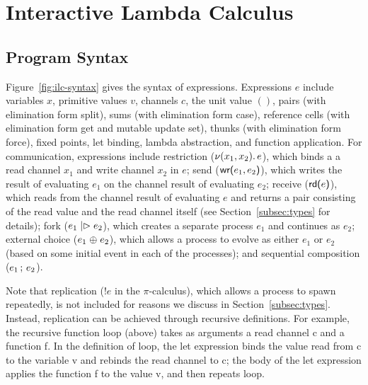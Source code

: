 \section{Interactive Lambda Calculus}
\label{sec:ilc}

\subsection{Program Syntax}
\label{subsec:syntax}

Figure~\ref{fig:ilc-syntax} gives the syntax of expressions. Expressions $e$
include variables $x$, primitive values $v$, channels $c$, the unit value $()$,
pairs (with elimination form \textsf{split}), sums (with elimination form
\textsf{case}), reference cells (with elimination form \textsf{get} and mutable
update \textsf{set}), thunks (with elimination form \textsf{force}), fixed
points, let binding, lambda abstraction, and function application. For
communication, expressions include restriction ($\nu(x_1, x_2).\,e$), which
binds a a read channel $x_1$ and write channel $x_2$ in $e$; send
($\text{\textsf{wr}}\textsf{(}{e_1},{e_2}\textsf{)}$), which writes the result of evaluating $e_1$ on the channel
result of evaluating $e_2$; receive ($\text{\textsf{rd}}\textsf{(}{e}\textsf{)}$), which reads from the channel
result of evaluating $e$ and returns a pair consisting of the read value and the
read channel itself (see Section~\ref{subsec:types} for details); fork ($e_1 \mathrel{|\rhd} e_2$), which creates a separate process $e_1$ and continues as $e_2$; external
choice ($e_1 \mathrel{\oplus} e_2$), which allows a process to evolve as either $e_1$ or
$e_2$ (based on some initial event in each of the processes); and sequential
composition (${e_1}\,;\,{e_2}$).

\begingroup
\setlength\intextsep{0pt}
\begin{wrapfigure}{r}{0.275\textwidth}
  
\end{wrapfigure}
Note that replication ($!e$ in the $\pi$-calculus), which allows a process to
spawn repeatedly, is not included for reasons we discuss in
Section~\ref{subsec:types}. Instead, replication can be achieved through
recursive definitions. For example, the recursive function \textsf{loop} (above)
takes as arguments a read channel \textsf{c} and a function \textsf{f}. In the
definition of \textsf{loop}, the let expression binds the value read from
\textsf{c} to the variable \textsf{v} and rebinds the read channel to
\textsf{c}; the body of the let expression applies the function \textsf{f} to
the value \textsf{v}, and then repeats \textsf{loop}.\mypar
\endgroup

